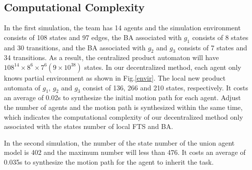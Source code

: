 \documentclass[journal]{IEEEtran}
\begin{document}
\subsection{Computational Complexity}
In the first simulation, the team has 14 agents and the simulation environment consists of 108 states and 97 edges, the BA associated with $g_1$ consists of 8 states and 30 transitions, and the BA associated with $g_2$ and $g_3$ consists of 7 states and 34 transitions. As a result, the centralized product automaton will have $108^{14}\times 8^6 \times 7^6(9\times 10^{38})$ states. In our decentralized method, each agent only knows partial environment as shown in Fig.\ref{envir}. The local new product automata of $g_1$, $g_2$ and $g_3$ consist of 136, 266 and 210 states, respectively. It costs an average of 0.02s to synthesize the initial motion path for each agent. Adjust the number of agents and the motion path is synthesized within the same time, which indicates the computational complexity of our decentralized method only associated with the states number of local FTS and BA.\par
In the second simulation, the number of the state number of the union agent model is 402 and the maximum number will less than 476. It costs an average of 0.035s to synthesize the motion path for the agent to inherit the task.

%
\end{document}
